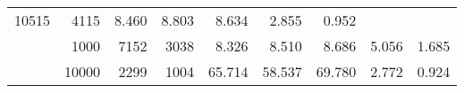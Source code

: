 \begin{table}
\begin{tabular}{rrrrrrrrr}
							     10515  & 4115  
	                           & 8.460 & 8.803 & 8.634
	                           & 2.855 & 0.952  \\
	                
	            
					 &  
					 
					\multirow{ 1 }{*}{ 1000 } &
					
						
							    
							     7152  & 3038  
	                           & 8.326 & 8.510 & 8.686
	                           & 5.056 & 1.685  \\
	                
	            
					 &  
					 
					\multirow{ 1 }{*}{ 10000 } &
					
						
							    
							     2299  & 1004  
	                           & 65.714 & 58.537 & 69.780
	                           & 2.772 & 0.924  \\
	                
	            
	        

\hline

\end{tabular}
\end{table}
\clearpage


	    


